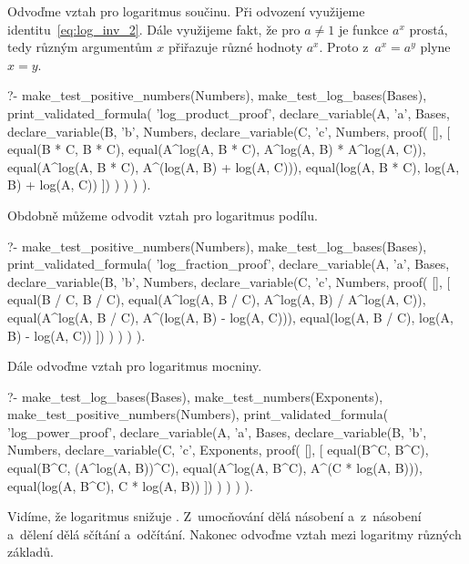 Odvoďme vztah pro logaritmus součinu. Při odvození využijeme identitu~\eqref{eq:log_inv_2}. Dále využijeme fakt, že pro \(a \neq 1\) je funkce \(a^x\) prostá, tedy různým argumentům \(x\) přiřazuje různé hodnoty \(a^x\). Proto z~\(a^x = a^y\) plyne \(x = y\).

\begin{prolog}
?-	make_test_positive_numbers(Numbers),
	make_test_log_bases(Bases),
	print_validated_formula(
		'log_product_proof',
		declare_variable(A, 'a', Bases,
			declare_variable(B, 'b', Numbers,
				declare_variable(C, 'c', Numbers,
					proof(
					[],
					[
						equal(B * C, B * C),
						equal(A^log(A, B * C), A^log(A, B) * A^log(A, C)),
						equal(A^log(A, B * C), A^(log(A, B) + log(A, C))),
						equal(log(A, B * C), log(A, B) + log(A, C))
					])
				)
			)
		)
	).				
\end{prolog}

Obdobně můžeme odvodit vztah pro logaritmus podílu.

\begin{prolog}
?-	make_test_positive_numbers(Numbers),
	make_test_log_bases(Bases),
	print_validated_formula(
		'log_fraction_proof',
		declare_variable(A, 'a', Bases,
			declare_variable(B, 'b', Numbers,
				declare_variable(C, 'c', Numbers,
					proof(
					[],
					[
						equal(B / C, B / C),
						equal(A^log(A, B / C), A^log(A, B) / A^log(A, C)),
						equal(A^log(A, B / C), A^(log(A, B) - log(A, C))),
						equal(log(A, B / C), log(A, B) - log(A, C))
					])
				)
			)
		)
	).				
\end{prolog}

Dále odvoďme vztah pro logaritmus mocniny.

\begin{prolog}
?-	make_test_log_bases(Bases),
	make_test_numbers(Exponents),
	make_test_positive_numbers(Numbers),
	print_validated_formula(
		'log_power_proof',
		declare_variable(A, 'a', Bases,
			declare_variable(B, 'b', Numbers,
				declare_variable(C, 'c', Exponents,
					proof(
					[],
					[
						equal(B^C, B^C),
						equal(B^C, (A^log(A, B))^C),
						equal(A^log(A, B^C), A^(C * log(A, B))),
						equal(log(A, B^C), C * log(A, B))
					])
				)
			)
		)
	).				
\end{prolog}

Vidíme, že logaritmus snižuje . Z~umocňování dělá násobení a~z~násobení a~dělení dělá sčítání a~odčítání. Nakonec odvoďme vztah mezi logaritmy různých základů.

